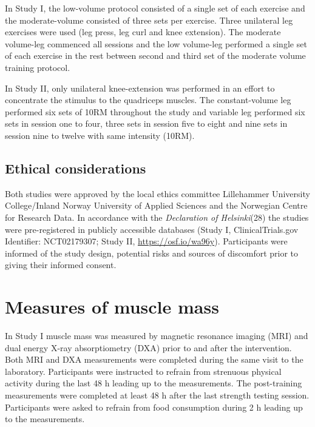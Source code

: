 \documentclass[twoside,10pt]{gihclass} %
\begin{document}
In Study I, the low-volume protocol consisted of a single set of each exercise and the moderate-volume consisted of three sets per exercise. Three unilateral leg exercises were used (leg press, leg curl and knee extension). The moderate volume-leg commenced all sessions and the low volume-leg performed a single set of each exercise in the rest between second and third set of the moderate volume training protocol.

In Study II, only unilateral knee-extension was performed in an effort to concentrate the stimulus to the quadriceps muscles. The constant-volume leg performed six sets of 10RM throughout the study and variable leg performed six sets in session one to four, three sets in session five to eight and nine sets in session nine to twelve with same intensity (10RM).

\hypertarget{ethical-considerations}{%
\subsection{Ethical considerations}\label{ethical-considerations}}

Both studies were approved by the local ethics committee Lillehammer University College/Inland Norway University of Applied Sciences and the Norwegian Centre for Research Data. In accordance with the \emph{Declaration of Helsinki}(28) the studies were pre-registered in publicly accessible databases (Study I, ClinicalTrials.gov Identifier: NCT02179307; Study II, \url{https://osf.io/wa96y}). Participants were informed of the study design, potential risks and sources of discomfort prior to giving their informed consent.

\hypertarget{measures-of-muscle-mass}{%
\section{Measures of muscle mass}\label{measures-of-muscle-mass}}

In Study I muscle mass was measured by magnetic resonance imaging (MRI) and dual energy X-ray absorptiometry (DXA) prior to and after the intervention. Both MRI and DXA measurements were completed during the same visit to the laboratory. Participants were instructed to refrain from strenuous physical activity during the last 48 h leading up to the measurements. The post-training measurements were completed at least 48 h after the last strength testing session. Participants were asked to refrain from food consumption during 2 h leading up to the measurements.
\end{document}
